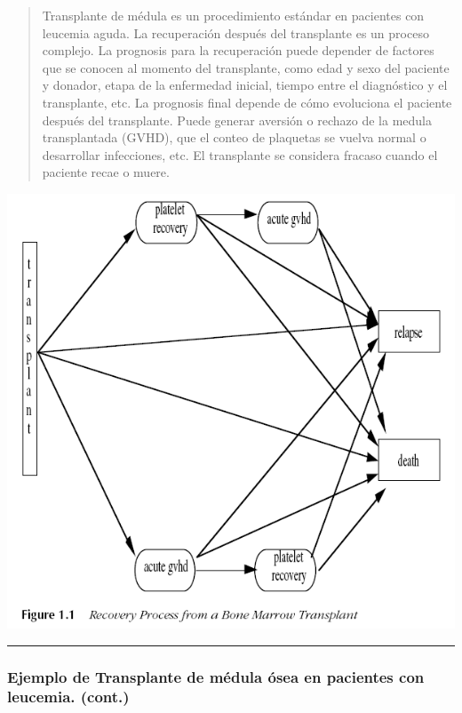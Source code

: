 \documentclass[
  letterpaper,
  DIV=11,
  numbers=noendperiod]{scrartcl}
\begin{document}
\begin{quote}
Transplante de médula es un procedimiento estándar en pacientes con
leucemia aguda. La recuperación después del transplante es un proceso
complejo. La prognosis para la recuperación puede depender de factores
que se conocen al momento del transplante, como edad y sexo del paciente
y donador, etapa de la enfermedad inicial, tiempo entre el diagnóstico y
el transplante, etc. La prognosis final depende de cómo evoluciona el
paciente después del transplante. Puede generar aversión o rechazo de la
medula transplantada (GVHD), que el conteo de plaquetas se vuelva normal
o desarrollar infecciones, etc. El transplante se considera fracaso
cuando el paciente recae o muere.
\end{quote}

\begin{center}
\includegraphics[width=0.4\linewidth,height=\textheight,keepaspectratio]{figura/ejemp2.png}
\end{center}

\begin{center}\rule{0.5\linewidth}{0.5pt}\end{center}

\subsubsection{Ejemplo de Transplante de médula ósea en pacientes con
leucemia.
(cont.)}\label{ejemplo-de-transplante-de-muxe9dula-uxf3sea-en-pacientes-con-leucemia.-cont.}
\end{document}
